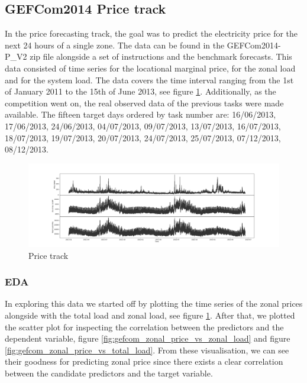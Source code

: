\subsection{GEFCom2014 Price track}
In the price forecasting track, the goal was to predict the electricity price for the next 24 hours of a single zone. 
The data can be found in the GEFCom2014-P\_V2 zip file alongside a set of instructions and the benchmark forecasts.
This data consisted of time series for the locational marginal price, for the zonal load and for the system load. The data covers the time interval ranging from the 1st of January 2011 to the 15th of June 2013, see figure \ref{fig:price_track_fig1}. 
Additionally, as the competition went on, the real observed data of the previous tasks were made available.
The fifteen target days ordered by task number are: 16/06/2013, 17/06/2013, 24/06/2013, 04/07/2013, 09/07/2013, 13/07/2013, 16/07/2013, 18/07/2013, 19/07/2013, 20/07/2013, 24/07/2013, 25/07/2013, 07/12/2013, 08/12/2013. 
\begin{figure}[!h]
    \includegraphics[width=\textwidth]{images/price_track_fig1.png}
    \caption{Price track}
    \label{fig:price_track_fig1}
\end{figure}
\subsubsection{EDA}
In exploring this data we started off by plotting the time series of the zonal prices alongside with the total load and zonal load, see figure \ref{fig:price_track_fig1}.
After that, we plotted the scatter plot for inspecting the correlation between the predictors and the dependent variable, figure \ref{fig:gefcom_zonal_price_vs_zonal_load} and figure \ref{fig:gefcom_zonal_price_vs_total_load}. From these visualisation, we can see their goodness for predicting zonal price since there exists a clear correlation between the candidate predictors and the target variable.

